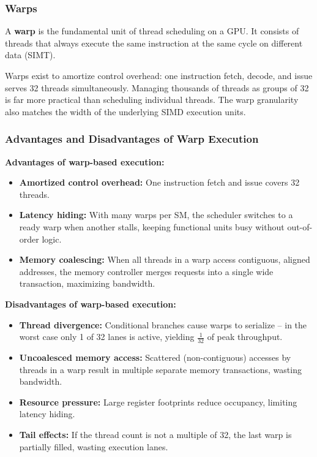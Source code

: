 \subsubsection{Warps}

\begin{definition}
    A \textbf{warp} is the fundamental unit of thread scheduling on a GPU. It consists of threads that always execute the same instruction at the same cycle on different data (SIMT). 
\end{definition}

\begin{remark}
    Warps exist to amortize control overhead: one instruction fetch, decode, and issue serves 32 threads simultaneously. Managing thousands of threads as groups of 32 is far more practical than scheduling individual threads. The warp granularity also matches the width of the underlying SIMD execution units.
\end{remark}

\subsubsection{Advantages and Disadvantages of Warp Execution}

\begin{theorem}
    \textbf{Advantages of warp-based execution:}
    \begin{itemize}
        \item \textbf{Amortized control overhead:} One instruction fetch and issue covers 32 threads.
        \item \textbf{Latency hiding:} With many warps per SM, the scheduler switches to a ready warp when another stalls, keeping functional units busy without out-of-order logic.
        \item \textbf{Memory coalescing:} When all threads in a warp access contiguous, aligned addresses, the memory controller merges requests into a single wide transaction, maximizing bandwidth.
    \end{itemize}
\end{theorem}

\begin{theorem}
    \textbf{Disadvantages of warp-based execution:}
    \begin{itemize}
        \item \textbf{Thread divergence:} Conditional branches cause warps to serialize -- in the worst case only 1 of 32 lanes is active, yielding $\frac{1}{32}$ of peak throughput.
        \item \textbf{Uncoalesced memory access:} Scattered (non-contiguous) accesses by threads in a warp result in multiple separate memory transactions, wasting bandwidth.
        \item \textbf{Resource pressure:} Large register footprints reduce occupancy, limiting latency hiding.
        \item \textbf{Tail effects:} If the thread count is not a multiple of 32, the last warp is partially filled, wasting execution lanes.
    \end{itemize}
\end{theorem}


